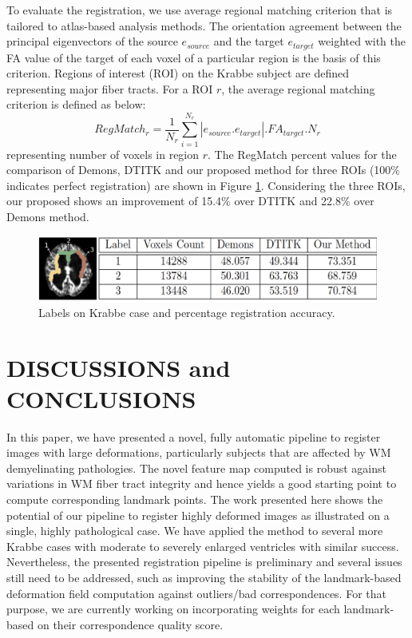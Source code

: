 \documentclass{llncs}
\begin{document}
To evaluate the registration, we use average regional matching criterion that is tailored to atlas-based analysis methods. The orientation agreement between the principal eigenvectors of the source $e_{source}$ and the target $e_{target}$ weighted with the FA value of the target of each voxel of a particular region is the basis of this criterion. Regions of interest (ROI) on the Krabbe subject are defined representing major fiber tracts. For a ROI $r$, the average regional matching criterion is defined as below: 
\begin{equation}
RegMatch_{r} = \frac{1}{N_{r}} \sum_{i=1}^{N_{r}} |e_{source}.e_{target}|.FA_{target}. N_{r}
\end{equation}
representing number of voxels in region $r$. The RegMatch percent values for the comparison of Demons, DTITK and our proposed method for three ROIs (100\% indicates perfect registration) are shown in Figure \ref{fig:Label_Table}. Considering the three ROIs, our proposed shows an improvement of 15.4\% over DTITK and 22.8\% over Demons method. 

\begin{figure}[htb]
\includegraphics[width=1.0\columnwidth]{images/Table_LabelMapMod2.png}
\centering
\caption{Labels on Krabbe case and percentage registration accuracy.}
\label{fig:Label_Table}
\end{figure}

\section{DISCUSSIONS and CONCLUSIONS}
In this paper, we have presented a novel, fully automatic pipeline to register images with large deformations, particularly subjects that are affected by WM demyelinating pathologies. The novel feature map computed is robust against variations in WM fiber tract integrity and hence yields a good starting point to compute corresponding landmark points. The work presented here shows the potential of our pipeline to register highly deformed images as illustrated on a single, highly pathological case. We have applied the method to several more Krabbe cases with moderate to severely enlarged ventricles with similar success. Nevertheless, the presented registration pipeline is preliminary and several issues still need to be addressed, such as improving the stability of the landmark-based deformation field computation against outliers/bad correspondences. For that purpose, we are currently working on incorporating weights for each landmark-based on their correspondence quality score.

%
%


\end{document}
